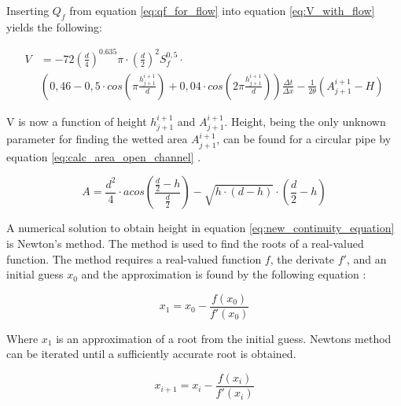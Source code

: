 Inserting $Q_f$ from equation \ref{eq:qf_for_flow} into equation \ref{eq:V_with_flow} yields the following:

\begin{equation}\label{eq:new_continuity_equation}
\begin{aligned}
    V &= -72\left(\frac{d}{4}\right)^{0.635}\pi\cdot\left(\frac{d}{2}\right)^2S_f^{0,5}\cdot \\ &\left(0,46-0,5\cdot cos\left(\pi \frac{h_{j+1}^{i+1}}{d}\right)+ 0,04\cdot cos\left(2\pi\frac{h_{j+1}^{i+1}}{d}\right)\right) \frac{\Delta t}{\Delta x}-\frac{1}{2\theta}\left(A_{j+1}^{i+1}-H\right)
\end{aligned}
\end{equation}

V is now a function of height $h_{j+1}^{i+1}$ and $A_{j+1}^{i+1}$. Height, being the only unknown parameter for finding the wetted area $A_{j+1}^{i+1}$, can be found for a circular pipe by equation \ref{eq:calc_area_open_channel} \cite{ikke_stationear}.

\begin{equation}\label{eq:calc_area_open_channel}
    A = \frac {d^2}{4} \cdot acos \left(\frac{\frac{d}{2}-h}{\frac{d}{2}}\right)-\sqrt{h\cdot (d-h)}\cdot  \left(\frac{d}{2}-h\right)
\end{equation}


A numerical solution to obtain height in equation \ref{eq:new_continuity_equation} is Newton's method. The method is used to find the roots of a real-valued function. The method requires a real-valued function $f$, the derivate $f'$, and an initial guess $x_0$ and the approximation is found by the following equation \cite{szymkiewicz2010numerical}:

\begin{equation}\label{eq:newtons_method_standard}
     x_1 = x_0 - \frac{f(x_0)}{f'(x_0)}
\end{equation} 

Where $x_1$ is an approximation of a root from the initial guess. Newtons method can be iterated until a sufficiently accurate root is obtained.

\begin{equation}\label{eq:newtons_method_standardv2}
     x_{i+1} = x_i - \frac{f(x_i)}{f'(x_i)}
\end{equation} 


